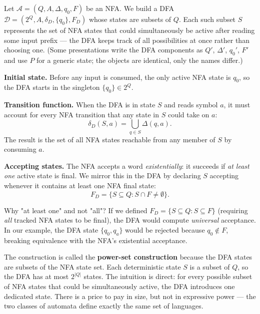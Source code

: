 \begin{formaldetails}[Construction]
Let $\mathcal{A}=(Q,A,\Delta,q_0,F)$ be an NFA.  We build a DFA
$\mathcal{D}=(2^Q,A,\delta_D,\{q_0\},F_D)$ whose states are subsets of
$Q$.  Each such subset $S$ represents the set of NFA states that could
simultaneously be active after reading some input prefix — the DFA keeps
track of all possibilities at once rather than choosing one.
(Some presentations write the DFA components as $Q'$, $\Delta'$,
$q_0'$, $F'$ and use $P$ for a generic state; the objects are
identical, only the names differ.)

\medskip
\noindent\textbf{Initial state.}  Before any input is consumed, the only
active NFA state is $q_0$, so the DFA starts in the singleton
$\{q_0\}\in 2^Q$.

\medskip
\noindent\textbf{Transition function.}  When the DFA is in state $S$ and
reads symbol $a$, it must account for every NFA transition that any
state in $S$ could take on $a$:
\[
  \delta_D(S,a)=\bigcup_{q\in S}\Delta(q,a).
\]
The result is the set of all NFA states reachable from any member of $S$
by consuming $a$.

\medskip
\noindent\textbf{Accepting states.}  The NFA accepts a word
\emph{existentially}: it succeeds if \emph{at least one} active state is
final.  We mirror this in the DFA by declaring $S$ accepting whenever it
contains at least one NFA final state:
\[
  F_D=\{S\subseteq Q:S\cap F\neq\emptyset\}.
\]
\end{formaldetails}

\begin{counterpoint}{Why "at least one" and not "all"?}
If we defined $F_D = \{S \subseteq Q : S \subseteq F\}$ (requiring \emph{all}
tracked NFA states to be final), the DFA would compute \emph{universal}
acceptance. In our example, the DFA state $\{q_0, q_a\}$ would be rejected
because $q_0 \notin F$, breaking equivalence with the NFA's existential acceptance.
\end{counterpoint}

The construction is called the \textbf{power-set construction} because
the DFA states are subsets of the NFA state set.  Each deterministic
state $S$ is a subset of $Q$, so the DFA has at most $2^{|Q|}$ states.
The intuition is direct: for every possible subset of NFA states that
could be simultaneously active, the DFA introduces one dedicated state.
There is a price to pay in size, but not in expressive power --- the two
classes of automata define exactly the same set of languages.

